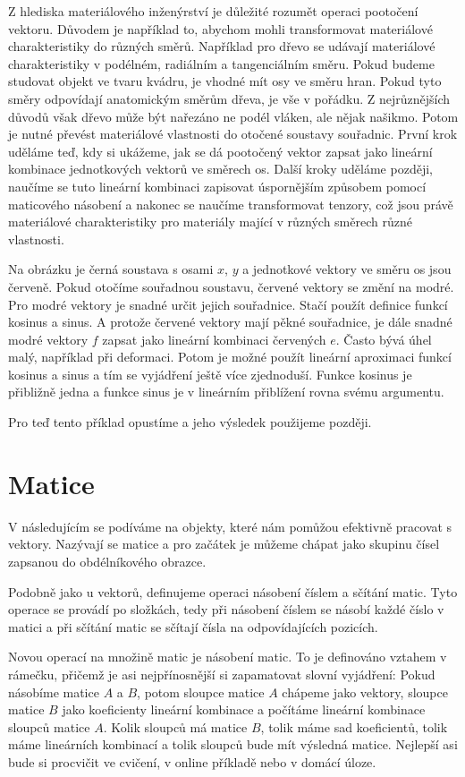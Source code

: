 \documentclass[12pt]{article}
\begin{document}
Z hlediska materiálového inženýrství je důležité rozumět operaci pootočení vektoru. Důvodem je například to, abychom mohli transformovat materiálové charakteristiky do různých směrů. Například pro dřevo se udávají materiálové charakteristiky  v podélném, radiálním a tangenciálním směru. Pokud budeme studovat objekt ve tvaru kvádru, je vhodné mít osy ve směru hran. Pokud tyto směry odpovídají anatomickým směrům dřeva, je vše v pořádku. Z nejrůznějších důvodů však dřevo může být nařezáno ne podél vláken, ale nějak našikmo. Potom je nutné převést materiálové vlastnosti do otočené soustavy souřadnic. První krok uděláme teď, kdy si ukážeme, jak se dá pootočený vektor zapsat jako lineární kombinace jednotkových vektorů ve směrech os. Další kroky uděláme později, naučíme se tuto lineární kombinaci zapisovat úspornějším způsobem pomocí maticového násobení a nakonec se naučíme transformovat tenzory, což jsou právě materiálové charakteristiky pro materiály mající v různých směrech různé vlastnosti.

Na obrázku je černá soustava s osami $x$, $y$ a jednotkové vektory ve směru os jsou červeně. Pokud otočíme souřadnou soustavu, červené vektory se změní na modré. Pro modré vektory je snadné určit jejich souřadnice. Stačí použít definice funkcí kosinus a sinus. A protože červené vektory mají pěkné souřadnice, je dále snadné modré vektory $f$ zapsat jako lineární kombinaci červených $e$. Často bývá úhel malý, například při deformaci. Potom je možné použít lineární aproximaci funkcí kosinus a sinus a tím se vyjádření ještě více zjednoduší. Funkce kosinus je přibližně jedna a funkce sinus je v lineárním přiblížení rovna svému argumentu.

Pro teď tento příklad opustíme a jeho výsledek použijeme později. 

\section{Matice}

V následujícím se podíváme na objekty, které nám pomůžou efektivně pracovat s vektory. Nazývají se matice a pro začátek je můžeme chápat jako skupinu čísel zapsanou do obdélníkového obrazce.  

Podobně jako u vektorů, definujeme operaci násobení číslem a sčítání matic. Tyto operace se provádí po složkách, tedy při násobení číslem se násobí každé číslo v matici a při sčítání matic se sčítají čísla na odpovídajících pozicích.

Novou operací na množině matic je násobení matic. To je definováno vztahem v rámečku, přičemž je asi nejpřínosnější si zapamatovat slovní vyjádření: Pokud násobíme matice $A$ a $B$, potom sloupce matice $A$ chápeme jako vektory, sloupce matice $B$ jako koeficienty lineární kombinace a počítáme lineární kombinace sloupců matice $A$. Kolik sloupců má matice $B$, tolik máme sad koeficientů, tolik máme lineárních kombinací a tolik sloupců bude mít výsledná matice. Nejlepší asi bude si procvičit ve cvičení, v online příkladě nebo v domácí úloze.
\end{document}
